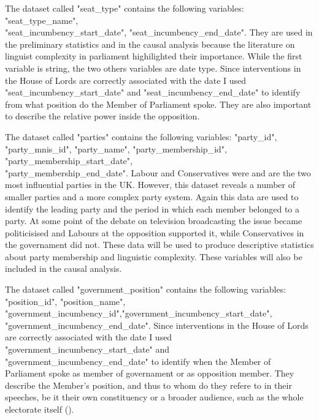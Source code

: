 The dataset called "seat\_type" contains the following variables: "seat\_type\_name",\\"seat\_incumbency\_start\_date", "seat\_incumbency\_end\_date". They are used in the preliminary statistics and in the causal analysis because the literature on linguist complexity in parliament highilighted their importance. While the first variable is string, the two others variables are date type. Since interventions in the House of Lords are correctly associated with the date I used "seat\_incumbency\_start\_date" and "seat\_incumbency\_end\_date" to identify from what position do the Member of Parliament spoke. They are also important to describe the relative power inside the opposition.

The dataset called "parties" contains the following variables: "party\_id", "party\_mnis\_id", "party\_name", "party\_membership\_id", "party\_membership\_start\_date",\\"party\_membership\_end\_date". Labour and Conservatives were and are the two most influential parties in the UK. However, this dataset reveals a number of smaller parties and a more complex party system. Again this data are used to identify the leading party and the period in which each member belonged to a party. At some point of the debate on television broadcasting the issue became politicisised and Labours at the opposition supported it, while Conservatives in the governament did not.%
These data will be used to produce descriptive statistics about party membership and linguistic complexity. These variables will also be included in the causal analysis.

The dataset called "government\_position" contains the following variables: "position\_id", "position\_name", "government\_incumbency\_id","government\_incumbency\_start\_date",\\"government\_incumbency\_end\_date". Since interventions in the House of Lords are correctly associated with the date I used "government\_incumbency\_start\_date" and "government\_incumbency\_end\_date" to identify when the Member of Parliament spoke as member of governament or as opposition member. They describe the Member's position, and thus to whom do they refere to in their speeches, be it their own constituency or a broader audience, such as the whole electorate itself (\textcite{spirlingDemocratizationLinguisticComplexity2016}).

